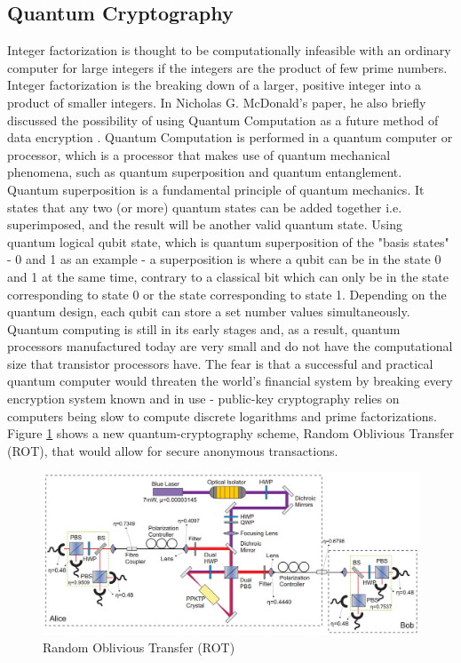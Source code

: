 \documentclass[journal]{IEEEtran}
\begin{document}
\subsection{\textbf{Quantum Cryptography}}
Integer factorization is thought to be computationally infeasible with an ordinary computer for large integers if the integers are the product of few prime numbers. Integer factorization is the breaking down of a larger, positive integer into a product of smaller integers. In Nicholas G. McDonald's paper, he also briefly discussed the possibility of using Quantum Computation as a future method of data encryption \cite{encryption_research}. Quantum Computation is performed in a quantum computer or processor, which is a processor that makes use of quantum mechanical phenomena, such as quantum superposition and quantum entanglement. Quantum superposition is a fundamental principle of quantum mechanics. It states that any two (or more) quantum states can be added together i.e. superimposed, and the result will be another valid quantum state. Using quantum logical qubit state, which is quantum superposition of the "basis states" - 0 and 1 as an example - a superposition is where a qubit can be in the state 0 and 1 at the same time, contrary to a classical bit which can only be in the state corresponding to state 0 or the state corresponding to state 1. Depending on the quantum design, each qubit can store a set number values simultaneously. Quantum computing is still in its early stages and, as a result, quantum processors manufactured today are very small and do not have the computational size that transistor processors have. The fear is that a successful and practical quantum computer would threaten the world's financial system by breaking every encryption system known and in use - public-key cryptography relies on computers being slow to compute discrete logarithms and prime factorizations. Figure \ref{fig:rot} shows a new quantum-cryptography scheme, Random Oblivious Transfer (ROT), that would allow for secure anonymous transactions.

\newline
\begin{figure}[!h]
    \centering
    \includegraphics[scale=.35]{ROT-experiment}
    \caption{Random Oblivious Transfer (ROT)}
    \label{fig:rot}
\end{figure}
\end{document}
